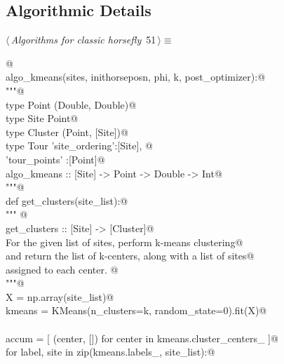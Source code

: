 \documentclass[11.5pt]{report}
\begin{document}
\subsection{Algorithmic Details}
\newchunk
\begin{flushleft} \small\label{scrap78}\raggedright\small
{} $\langle\,${\itshape Algorithms for classic horsefly}\nobreak\ {\footnotesize {51}}$\,\rangle\equiv$
\vspace{-1ex}
\begin{list}{}{} \item
\mbox{}\verb@   @\\
\mbox{}\verb@def algo_kmeans(sites, inithorseposn, phi, k, post_optimizer):@\\
\mbox{}\verb@     """@\\
\mbox{}\verb@     type Point   (Double, Double)@\\
\mbox{}\verb@     type Site    Point@\\
\mbox{}\verb@     type Cluster (Point, [Site])@\\
\mbox{}\verb@     type Tour    {'site_ordering':[Site], @\\
\mbox{}\verb@                   'tour_points'  :[Point]}@\\
\mbox{}\verb@     algo_kmeans :: [Site] -> Point -> Double -> Int@\\
\mbox{}\verb@     """@\\
\mbox{}\verb@     def get_clusters(site_list):@\\
\mbox{}\verb@           """ @\\
\mbox{}\verb@           get_clusters :: [Site] -> [Cluster]@\\
\mbox{}\verb@           For the given list of sites, perform k-means clustering@\\
\mbox{}\verb@           and return the list of k-centers, along with a list of sites@\\
\mbox{}\verb@           assigned to each center. @\\
\mbox{}\verb@           """@\\
\mbox{}\verb@           X      = np.array(site_list)@\\
\mbox{}\verb@           kmeans = KMeans(n_clusters=k, random_state=0).fit(X)@\\
\mbox{}\verb@@\\
\mbox{}\verb@           accum = [ (center, [])  for center in kmeans.cluster_centers_ ]@\\
\mbox{}\verb@           for label, site in zip(kmeans.labels_, site_list):@\\

\end{list}
\end{flushleft}
\end{document}
